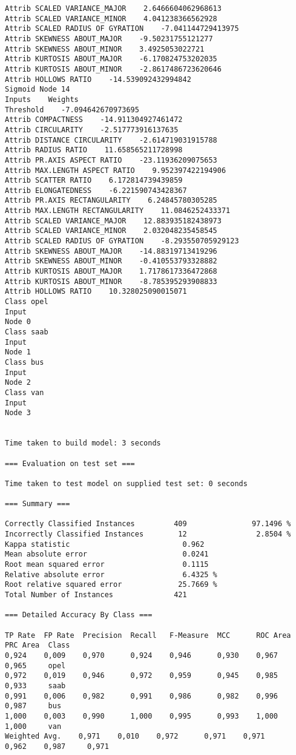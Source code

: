 \documentclass[
	article,			%
	11pt,				%
	oneside,			%
	a4paper,			%
	english,			%
	brazil,				%
	sumario=tradicional
	]{abntex2}
\begin{document}
\begin{lstlisting}
Attrib SCALED VARIANCE_MAJOR    2.6466604062968613
Attrib SCALED VARIANCE_MINOR    4.041238366562928
Attrib SCALED RADIUS OF GYRATION    -7.041144729413975
Attrib SKEWNESS ABOUT_MAJOR    -9.50231755121277
Attrib SKEWNESS ABOUT_MINOR    3.4925053022721
Attrib KURTOSIS ABOUT_MAJOR    -6.170824753202035
Attrib KURTOSIS ABOUT_MINOR    -2.8617486723620646
Attrib HOLLOWS RATIO    -14.539092432994842
Sigmoid Node 14
Inputs    Weights
Threshold    -7.094642670973695
Attrib COMPACTNESS    -14.911304927461472
Attrib CIRCULARITY    -2.517773916137635
Attrib DISTANCE CIRCULARITY    -2.614719031915788
Attrib RADIUS RATIO    11.658565211728998
Attrib PR.AXIS ASPECT RATIO    -23.11936209075653
Attrib MAX.LENGTH ASPECT RATIO    9.952397422194906
Attrib SCATTER RATIO    6.172814739439859
Attrib ELONGATEDNESS    -6.221590743428367
Attrib PR.AXIS RECTANGULARITY    6.24845780305285
Attrib MAX.LENGTH RECTANGULARITY    11.0846252433371
Attrib SCALED VARIANCE_MAJOR    12.883935182438973
Attrib SCALED VARIANCE_MINOR    2.032048235458545
Attrib SCALED RADIUS OF GYRATION    -8.293550705929123
Attrib SKEWNESS ABOUT_MAJOR    -14.88319713419296
Attrib SKEWNESS ABOUT_MINOR    -0.410553793328882
Attrib KURTOSIS ABOUT_MAJOR    1.7178617336472868
Attrib KURTOSIS ABOUT_MINOR    -8.785395293908833
Attrib HOLLOWS RATIO    10.328025090015071
Class opel
Input
Node 0
Class saab
Input
Node 1
Class bus
Input
Node 2
Class van
Input
Node 3


Time taken to build model: 3 seconds

=== Evaluation on test set ===

Time taken to test model on supplied test set: 0 seconds

=== Summary ===

Correctly Classified Instances         409               97.1496 %
Incorrectly Classified Instances        12                2.8504 %
Kappa statistic                          0.962 
Mean absolute error                      0.0241
Root mean squared error                  0.1115
Relative absolute error                  6.4325 %
Root relative squared error             25.7669 %
Total Number of Instances              421     

=== Detailed Accuracy By Class ===

TP Rate  FP Rate  Precision  Recall   F-Measure  MCC      ROC Area  PRC Area  Class
0,924    0,009    0,970      0,924    0,946      0,930    0,967     0,965     opel
0,972    0,019    0,946      0,972    0,959      0,945    0,985     0,933     saab
0,991    0,006    0,982      0,991    0,986      0,982    0,996     0,987     bus
1,000    0,003    0,990      1,000    0,995      0,993    1,000     1,000     van
Weighted Avg.    0,971    0,010    0,972      0,971    0,971      0,962    0,987     0,971     


\end{lstlisting}
\end{document}
